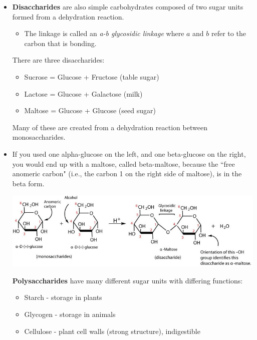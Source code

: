 \documentclass[letterpaper]{article}
\numberwithin{equation}{section}
\theoremstyle{classic}
\begin{document}
\begin{itemize}
    \item \textbf{Disaccharides} are also simple carbohydrates composed of two sugar units formed from a dehydration reaction.
    
    \begin{itemize}
        \item The linkage is called an \textit{a-b glycosidic linkage} where $a$ and $b$ refer to the carbon that is bonding.
    \end{itemize}
    \begin{idea}
        There are three disaccharides:
        \begin{itemize}
            \item Sucrose = Glucose + Fructose (table sugar)
            \item Lactose = Glucose + Galactose (milk)
            \item Maltose = Glucose + Glucose (seed sugar)
        \end{itemize}
        Many of these are created from a dehydration reaction between monosaccharides.
        \end{idea}
    \item If you used one alpha-glucose on the left, and one beta-glucose on the right, you would end up with a maltose, called beta-maltose, because the ``free anomeric carbon" (i.e., the carbon 1 on the right side of maltose), is in the beta form.
    \begin{center}\includegraphics[width=0.8\linewidth]{A1.png}\end{center}
    \begin{idea}
        \textbf{Polysaccharides} have many different sugar units with differing functions:
        \begin{itemize}
            \item Starch - storage in plants
            \item Glycogen - storage in animals
            \item Cellulose - plant cell walls (strong structure), indigestible

\end{itemize}
\end{idea}
\end{itemize}
\end{document}
